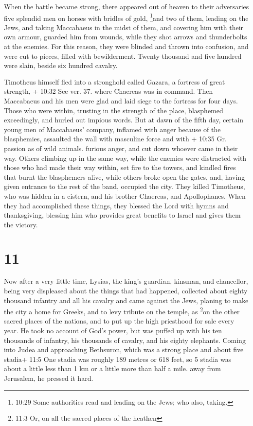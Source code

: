  When the battle became strong, there appeared out of
heaven to their adversaries five splendid men on horses with bridles of
gold, \footnote{10:29 Some authorities read and leading on the Jews; who
  also, taking.}and two of them, leading on the Jews,  and
taking Maccabaeus in the midst of them, and covering him with their own
armour, guarded him from wounds, while they shot arrows and thunderbolts
at the enemies. For this reason, they were blinded and thrown into
confusion, and were cut to pieces, filled with bewilderment.
 Twenty thousand and five hundred were slain, beside six
hundred cavalry.

 Timotheus himself fled into a stronghold called Gazara, a
fortress of great strength, + 10:32 See ver. 37. where Chaereas was in
command.  Then Maccabaeus and his men were glad and laid
siege to the fortress for four days.  Those who were
within, trusting in the strength of the place, blasphemed exceedingly,
and hurled out impious words.  But at dawn of the fifth
day, certain young men of Maccabaeus' company, inflamed with anger
because of the blasphemies, assaulted the wall with masculine force and
with + 10:35 Gr. passion as of wild animals. furious anger, and cut down
whoever came in their way.  Others climbing up in the same
way, while the enemies were distracted with those who had made their way
within, set fire to the towers, and kindled fires that burnt the
blasphemers alive, while others broke open the gates, and, having given
entrance to the rest of the band, occupied the city.  They
killed Timotheus, who was hidden in a cistern, and his brother Chaereas,
and Apollophanes.  When they had accomplished these things,
they blessed the Lord with hymns and thanksgiving, blessing him who
provides great benefits to Israel and gives them the victory.

\hypertarget{section-9}{%
\section{11}\label{section-9}}

 Now after a very little time, Lysias, the king's guardian,
kinsman, and chancellor, being very displeased about the things that had
happened,  collected about eighty thousand infantry and all
his cavalry and came against the Jews, planing to make the city a home
for Greeks,  and to levy tribute on the temple, as
\footnote{11:3 Or, on all the sacred places of the heathen}on the other
sacred places of the nations, and to put up the high priesthood for sale
every year.  He took no account of God's power, but was
puffed up with his ten thousands of infantry, his thousands of cavalry,
and his eighty elephants.  Coming into Judea and approaching
Bethsuron, which was a strong place and about five stadia+ 11:5 One
stadia was roughly 189 metres or 618 feet, so 5 stadia was about a
little less than 1 km or a little more than half a mile. away from
Jerusalem, he pressed it hard.

